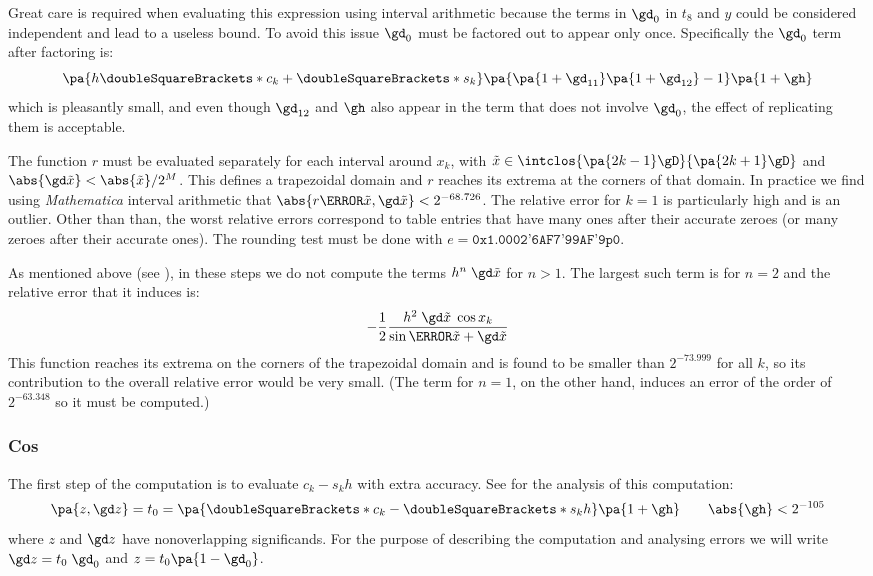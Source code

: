 \documentclass[10pt, a4paper, twoside]{basestyle}
\newcommand{\round}[1]{\doubleSquareBrackets*{#1}}
\newcommand{\red}[1]{\tilde{#1}}
\begin{document}
Great care is required when evaluating this expression using interval arithmetic because the terms in $\gd_0$ in $t_8$ and $y$ could be considered independent and lead to a useless bound.  To avoid this issue $\gd_0$ must be factored out to appear only once.  Specifically the $\gd_0$ term after factoring is:
\[
\pa{h \round{c_k} + \round{s_k}} \pa{\pa{1 + \gd_{11}} \pa{1 + \gd_{12}} - 1} \pa{1 + \gh}
\]
which is pleasantly small, and even though $\gd_{12}$ and $\gh$ also appear in the term that does not involve $\gd_0$, the effect of replicating them is acceptable.

The function $r$ must be evaluated separately for each interval around $x_k$, with $\red x \in \intclos{\pa{2 k - 1}\gD}{\pa{2 k + 1}\gD}$ and $\abs{\gd \red x} < {\abs{\red x}} / 2^M$.  This defines a trapezoidal domain and $r$ reaches its extrema at the corners of that domain.  In practice we find using \textit{Mathematica} interval arithmetic that $\abs{r\of{\red x, \gd \red x}} < 2^{-68.726}$.  The relative error for $k = 1$ is particularly high and is an outlier.  Other than than, the worst relative errors correspond to table entries that have many ones after their accurate zeroes (or many zeroes after their accurate ones).  The rounding test must be done with $e = \texttt{0x1.0002'6AF7'99AF'9p0}$.

As mentioned above (see ), in these steps we do not compute the terms $h^n \; \gd \red x$ for $n > 1$.  The largest such term is for $n = 2$ and the relative error that it induces is:
\[
-\frac{1}{2}\frac{h^2 \; \gd \red x \; \cos x_k}{\sin\of{\red x + \gd \red x}}
\]
This function reaches its extrema on the corners of the trapezoidal domain and is found to be smaller than $2^{-73.999}$ for all $k$, so its contribution to the overall relative error would be very small.  (The term for $n = 1$, on the other hand, induces an error of the order of $2^{-63.348}$ so it must be computed.)

\subsubsection*{Cos}\label{secerroranalysiscos}

The first step of the computation is to evaluate $c_k - s_k h$ with extra accuracy.  See  for the analysis of this computation:
\[
\pa{z, \gd z} = t_0 = \pa{\round{c_k} - \round{s_k} h} \pa{1 + \gh} \qquad \abs{\gh} < 2^{-105}
\]
where $z$ and $\gd z$ have nonoverlapping significands.  For the purpose of describing the computation and analysing errors we will write $\gd z = t_0 \; \gd_0$ and $z = t_0 \pa{1 - \gd_0}$.
\end{document}
